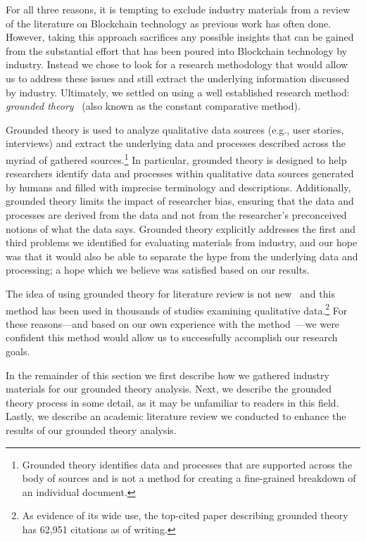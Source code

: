 For all three reasons, it is tempting to exclude industry materials from a review of the literature on Blockchain technology as previous work has often done.
However, taking this approach sacrifices any possible insights that can be gained from the substantial effort that has been poured into Blockchain technology by industry.
Instead we chose to look for a research methodology that would allow us to address these issues and still extract the underlying information discussed by industry.
Ultimately, we settled on using a well established research method: \emph{grounded theory}~\cite{glaser1965constant,strauss1990basics,corbin1990grounded} (also known as the constant comparative method).

Grounded theory is used to analyze qualitative data sources (e.g., user stories, interviews) and extract the underlying data and processes described across the myriad of gathered sources.\footnote{Grounded theory identifies data and processes that are supported across the body of sources and is not a method for creating a fine-grained breakdown of an individual document.}
In particular, grounded theory is designed to help researchers identify data and processes within qualitative data sources generated by humans and filled with imprecise terminology and descriptions.
Additionally, grounded theory limits the impact of researcher bias, ensuring that the data and processes are derived from the data and not from the researcher's preconceived notions of what the data says.
Grounded theory explicitly addresses the first and third problems we identified for evaluating materials from industry, and our hope was that it would also be able to separate the hype from the underlying data and processing; a hope which we believe was satisfied based on our results.

The idea of using grounded theory for literature review is not new~\cite{wolfswinkel2013using,yang2012descriptive} and this method has been used in thousands of studies examining qualitative data.\footnote{As evidence of its wide use, the top-cited paper describing grounded theory has 62,951 citations as of writing.}
For these reasons---and based on our own experience with the method~\cite{ruoti2017weighing}---we were confident this method would allow us to successfully accomplish our research goals.

In the remainder of this section we first describe how we gathered industry materials for our grounded theory analysis.
Next, we describe the grounded theory process in some detail, as it may be unfamiliar to readers in this field.
Lastly, we describe an academic literature review we conducted to enhance the results of our grounded theory analysis.

